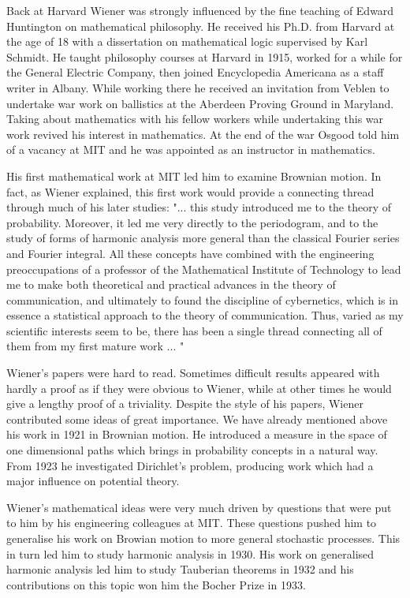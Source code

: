 Back at Harvard Wiener was strongly influenced by the fine teaching of Edward Huntington on mathematical philosophy. He received his Ph.D. from Harvard at the age of 18 with a dissertation on mathematical logic supervised by Karl Schmidt. He taught philosophy courses at Harvard in 1915, worked for a while for the General Electric Company, then joined Encyclopedia Americana as a staff writer in Albany. While working there he received an invitation from Veblen to undertake war work on ballistics at the Aberdeen Proving Ground in Maryland. Taking about mathematics with his fellow workers while undertaking this war work revived his interest in mathematics. At the end of the war Osgood told him of a vacancy at MIT and he was appointed as an instructor in mathematics. 

His first mathematical work at MIT led him to examine Brownian motion. In fact, as Wiener explained, this first work would provide a connecting thread through much of his later studies: "... this study introduced me to the theory of probability. Moreover, it led me very directly to the periodogram, and to the study of forms of harmonic analysis more general than the classical Fourier series and Fourier integral. All these concepts have combined with the engineering preoccupations of a professor of the Mathematical Institute of Technology to lead me to make both theoretical and practical advances in the theory of communication, and ultimately to found the discipline of cybernetics, which is in essence a statistical approach to the theory of communication. Thus, varied as my scientific interests seem to be, there has been a single thread connecting all of them from my first mature work ... "

Wiener's papers were hard to read. Sometimes difficult results appeared with hardly a proof as if they were obvious to Wiener, while at other times he would give a lengthy proof of a triviality. Despite the style of his papers, Wiener contributed some ideas of great importance. We have already mentioned above his work in 1921 in Brownian motion. He introduced a measure in the space of one dimensional paths which brings in probability concepts in a natural way. From 1923 he investigated Dirichlet's problem, producing work which had a major influence on potential theory. 

Wiener's mathematical ideas were very much driven by questions that were put to him by his engineering colleagues at MIT. These questions pushed him to generalise his work on Browian motion to more general stochastic processes. This in turn led him to study harmonic analysis in 1930. His work on generalised harmonic analysis led him to study Tauberian theorems in 1932 and his contributions on this topic won him the Bocher Prize in 1933.


